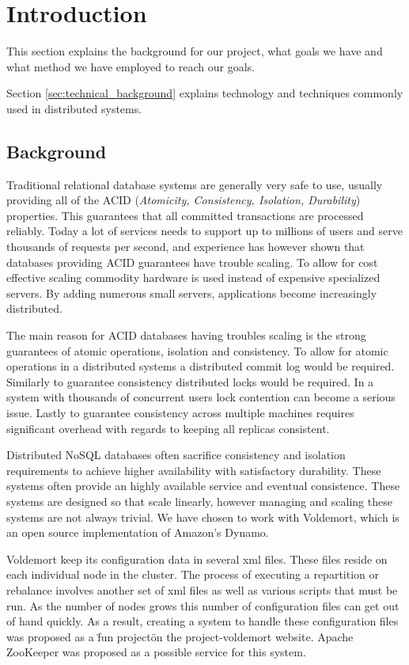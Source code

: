 
\section{Introduction}
This section explains the background for our project, what goals we have and what method we have employed to reach our goals. 

Section \ref{sec:technical_background} explains technology and techniques commonly used in distributed systems.


\subsection{Background}
Traditional relational database systems are generally very safe to use, usually providing all of the ACID (\emph{Atomicity, Consistency, Isolation, Durability}) properties.
This guarantees that all committed transactions are processed reliably. 
Today a lot of services needs to support up to millions of users and serve thousands of requests per second, and experience has however shown that databases providing ACID guarantees have trouble scaling. 
To allow for cost effective scaling commodity hardware is used instead of expensive specialized servers. By adding numerous small servers, applications become increasingly distributed. 

The main reason for ACID databases having troubles scaling is the strong guarantees of atomic operations, isolation and consistency. 
To allow for atomic operations in a distributed systems a distributed commit log would be required. Similarly to guarantee consistency distributed locks would be required. In a system with thousands of concurrent users lock contention can become a serious issue. 
Lastly to guarantee consistency across multiple machines requires significant overhead with regards to keeping all replicas consistent. 

Distributed NoSQL databases often sacrifice consistency and isolation requirements to achieve higher availability with satisfactory durability. These systems often provide an highly available service and eventual consistence. These systems are designed so that scale linearly, however managing and scaling these systems are not always trivial.\cite{tellybug} We have chosen to work with Voldemort, which is an open source implementation of Amazon's Dynamo.

Voldemort keep its configuration data in several xml files. These files reside on each individual node in the cluster. The process of executing a repartition or rebalance involves another set of xml files as well as various scripts that must be run. As the number of nodes grows this number of configuration files can get out of hand quickly. As a result, creating a system to handle these configuration files was proposed as a \"fun project\" on the project-voldemort website. Apache ZooKeeper was proposed as a possible service for this system.  

